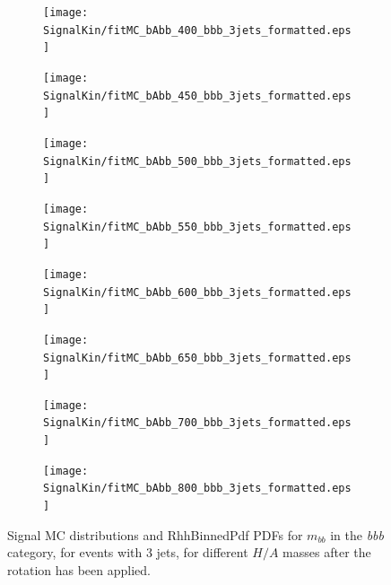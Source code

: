 

\begin{figure}[phtb!]
  \begin{center}
  \begin{subfigure}[$m_{A}=400$ GeV]{0.4\textwidth}\texttt{[image: SignalKin/fitMC\_bAbb\_400\_bbb\_3jets\_formatted.eps]}\end{subfigure}
  \begin{subfigure}[$m_{A}=450$ GeV]{0.4\textwidth}\texttt{[image: SignalKin/fitMC\_bAbb\_450\_bbb\_3jets\_formatted.eps]}\end{subfigure}
  \begin{subfigure}[$m_{A}=500$ GeV]{0.4\textwidth}\texttt{[image: SignalKin/fitMC\_bAbb\_500\_bbb\_3jets\_formatted.eps]}\end{subfigure}
  \begin{subfigure}[$m_{A}=550$ GeV]{0.4\textwidth}\texttt{[image: SignalKin/fitMC\_bAbb\_550\_bbb\_3jets\_formatted.eps]}\end{subfigure}
  \begin{subfigure}[$m_{A}=600$ GeV]{0.4\textwidth}\texttt{[image: SignalKin/fitMC\_bAbb\_600\_bbb\_3jets\_formatted.eps]}\end{subfigure}
  \begin{subfigure}[$m_{A}=650$ GeV]{0.4\textwidth}\texttt{[image: SignalKin/fitMC\_bAbb\_650\_bbb\_3jets\_formatted.eps]}\end{subfigure}
  \begin{subfigure}[$m_{A}=700$ GeV]{0.4\textwidth}\texttt{[image: SignalKin/fitMC\_bAbb\_700\_bbb\_3jets\_formatted.eps]}\end{subfigure}
  \begin{subfigure}[$m_{A}=800$ GeV]{0.4\textwidth}\texttt{[image: SignalKin/fitMC\_bAbb\_800\_bbb\_3jets\_formatted.eps]}\end{subfigure}
  \caption{Signal MC distributions and RhhBinnedPdf PDFs for $m_{bb}$ in the {\it bbb} category, for events with 3 jets, for different $H/A$ masses after the rotation has been applied.\label{fig:signalPDFs_3j_bbb}} 
    \end{center}
\end{figure}


